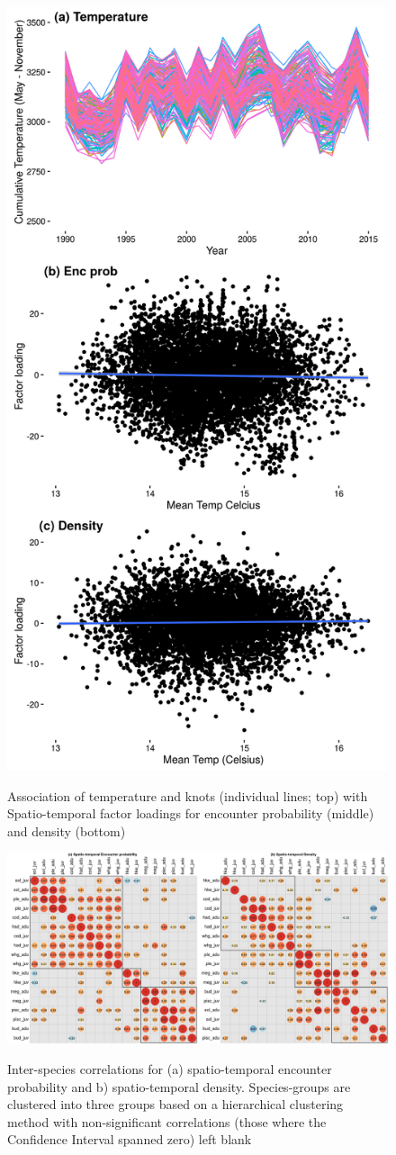 \documentclass{article}
\begin{document}
\begin{figure}[!ht]
\begin{center}
	\includegraphics[width = 0.6\linewidth]{"figures/Suppl - TempAndFactors"}
	\label{fig:S6}
	\caption{Association of temperature and knots (individual lines; top)
		with Spatio-temporal factor loadings for encounter probability
	(middle) and density (bottom)}
	\end{center}
\end{figure}



\begin{figure}[!ht]
\begin{center}
	\includegraphics[width = \linewidth]{"figures/Suppl - Epsilon1Epsilon2_Correlations_blank"}
	\label{fig:S8}
	\caption{Inter-species correlations for (a) spatio-temporal encounter
		probability and b) spatio-temporal density.  Species-groups are
		clustered into three groups based on a hierarchical clustering
		method with non-significant correlations (those where the
		Confidence Interval spanned zero) left blank}
	\end{center}
\end{figure}
\end{document}
